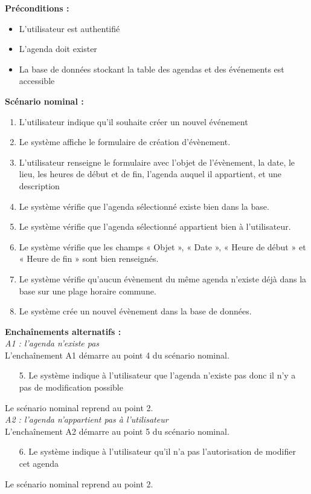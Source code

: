 \documentclass[12pt , a4paper]{article}
\begin{document}
\noindent\textbf{Préconditions :}
\begin{itemize}
\item L’utilisateur est authentifié
\item L'agenda doit exister
\item La base de données stockant la table des agendas et des événements est accessible\\
\end{itemize}


\noindent\textbf{Scénario nominal :}
\begin{enumerate}
\item L’utilisateur indique qu'il souhaite créer un nouvel événement
\item Le système affiche le formulaire de création d’évènement.
\item L’utilisateur renseigne le formulaire avec l’objet de l’évènement, la date, le lieu, les heures de début et de fin, l’agenda auquel il appartient, et une description
\item Le système vérifie que l’agenda sélectionné existe bien dans la base.
\item Le système vérifie que l’agenda sélectionné appartient bien à l’utilisateur.
\item Le système vérifie que les champs « Objet », « Date », « Heure de début » et « Heure de fin » sont bien renseignés.
\item Le système vérifie qu’aucun évènement du même agenda n’existe déjà dans la base sur une plage horaire commune.
\item Le système crée un nouvel évènement  dans la base de données.\\
\end{enumerate}

\noindent\textbf{Encha\^inements alternatifs :}\\
\noindent\textit{A1 : l’agenda n’existe pas}\\
L'encha\^inement A1 démarre au point 4 du scénario nominal.
\begin{enumerate}
\item[5.] Le système indique à l’utilisateur que l’agenda n’existe pas donc il n’y a pas de modification possible
\end{enumerate}
Le scénario nominal reprend au point 2.\\


\noindent\textit{A2 : l’agenda n’appartient pas à l’utilisateur}\\
L'encha\^inement A2 démarre au point 5 du scénario nominal.
\begin{enumerate}
\item[6.] Le système indique à l’utilisateur qu’il n’a pas l’autorisation de modifier cet agenda
\end{enumerate}
Le scénario nominal reprend au point 2.\\
\end{document}
